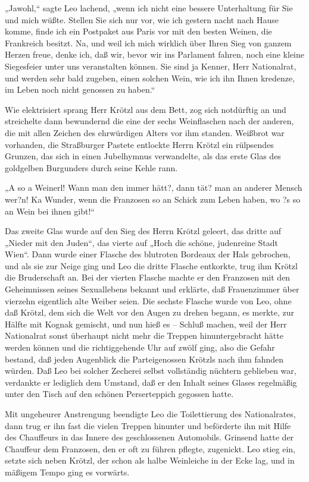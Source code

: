„Jawohl,“ sagte Leo lachend, „wenn ich nicht eine bessere
Unterhaltung für Sie und mich wüßte. Stellen Sie sich nur vor, wie
ich gestern nacht nach Hause komme, finde ich ein Postpaket aus
Paris vor mit den besten Weinen, die Frankreich besitzt. Na, und
weil ich mich wirklich über Ihren Sieg von ganzem Herzen freue,
denke ich, daß wir, bevor wir ins Parlament fahren, noch eine
kleine Siegesfeier unter uns veranstalten können. Sie sind ja
Kenner, Herr Nationalrat, und werden sehr bald zugeben, einen
solchen Wein, wie ich ihn Ihnen kredenze, im Leben noch nicht
genossen zu haben.“

Wie elektrisiert sprang Herr Krötzl aus dem Bett, zog sich
notdürftig an und streichelte dann bewundernd die eine der sechs
Weinflaschen nach der anderen, die mit allen Zeichen des
ehrwürdigen Alters vor ihm standen. Weißbrot war vorhanden, die
Straßburger Pastete entlockte Herrn Krötzl ein rülpsendes Grunzen,
das sich in einen Jubelhymnus  verwandelte, als das
erste Glas des goldgelben Burgunders durch seine Kehle rann.

„A so a Weinerl! Wann man den immer hätt?, dann tät? man an anderer
Mensch wer?n! Ka Wunder, wenn die Franzosen so an Schick zum Leben
haben, wo ?s so an Wein bei ihnen gibt!“

Das zweite Glas wurde auf den Sieg des Herrn Krötzl geleert, das
dritte auf „Nieder mit den Juden“, das vierte auf „Hoch die schöne,
judenreine Stadt Wien“. Dann wurde einer Flasche des blutroten
Bordeaux der Hals gebrochen, und als sie zur Neige ging und Leo die
dritte Flasche entkorkte, trug ihm Krötzl die Bruderschaft an. Bei
der vierten Flasche machte er den Franzosen mit den Geheimnissen
seines Sexuallebens bekannt und erklärte, daß Frauenzimmer über
vierzehn eigentlich alte Weiber seien. Die sechste Flasche wurde
von Leo, ohne daß Krötzl, dem sich die Welt vor den Augen zu drehen
begann, es merkte, zur Hälfte mit Kognak gemischt, und nun hieß es
– Schluß machen, weil der Herr Nationalrat sonst überhaupt nicht
mehr die Treppen hinuntergebracht hätte werden können und die
richtiggehende Uhr auf zwölf ging, also die Gefahr bestand, daß
jeden Augenblick die Parteigenossen Krötzls nach ihm fahnden
würden. Daß Leo bei solcher Zecherei selbst vollständig nüchtern
geblieben war, verdankte er lediglich dem Umstand, daß er den
Inhalt seines Glases regelmäßig unter den Tisch auf den schönen
Perserteppich gegossen hatte.

Mit ungeheurer Anstrengung beendigte Leo die Toilettierung des
Nationalrates, dann trug er ihn fast die vielen Treppen hinunter
und beförderte ihn mit Hilfe des  Chauffeurs in das
Innere des geschlossenen Automobils. Grinsend hatte der Chauffeur
dem Franzosen, den er oft zu führen pflegte, zugenickt. Leo stieg
ein, setzte sich neben Krötzl, der schon als halbe Weinleiche in
der Ecke lag, und in mäßigem Tempo ging es vorwärts.

